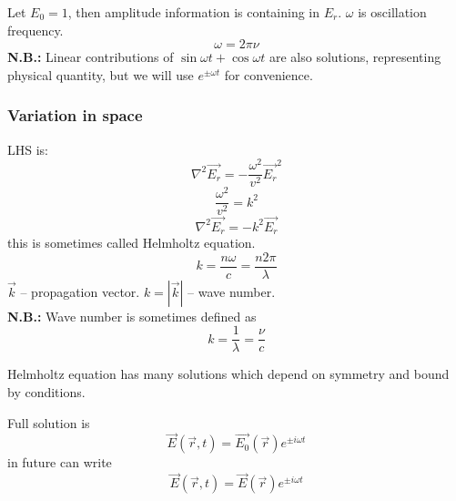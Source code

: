 \documentclass[10pt]{article}
\begin{document}
Let $E_0 = 1$, then amplitude information is containing in $E_r$. $\omega$ is oscillation frequency.
\begin{equation*}
\omega = 2 \pi\nu
\end{equation*}
\textbf{N.B.:} Linear contributions of $\sin{\omega t} + \cos{\omega t}$ are also solutions, representing physical quantity, but we will use $e^{\pm \omega t}$ for convenience.

\subsubsection{Variation in space}
LHS is:
\begin{equation*}
\nabla^2 \vec{E_r} = - \frac{\omega^2}{v^2}\vec{E_r}^2
\end{equation*}
\begin{equation*}
\frac{\omega^2}{v^2} = k^2
\end{equation*}
\begin{equation}\boxed{
\nabla^2 \vec{E_r} = -k^2 \vec{E_r}
}\end{equation}
this is sometimes called Helmholtz equation.
\begin{equation*}
k = \frac{n \omega}{c} = \frac{n2\pi}{\lambda}
\end{equation*}
$\vec{k}$ -- propagation vector. $k=|\vec{k}|$ -- wave number. \\
\textbf{N.B.:} Wave number is sometimes defined as
\begin{equation*}
k = \frac{1}{\lambda} = \frac{\nu}{c}
\end{equation*}

Helmholtz equation has many solutions which depend on symmetry and bound by conditions.

Full solution is
\begin{equation*}
\vec{E}(\vec{r},t) = \vec{E_0}(\vec{r})e^{\pm i\omega t}
\end{equation*}
in future can write
\begin{equation*}
\vec{E}(\vec{r},t) = \vec{E}(\vec{r})e^{\pm i\omega t}
\end{equation*}
\end{document}
